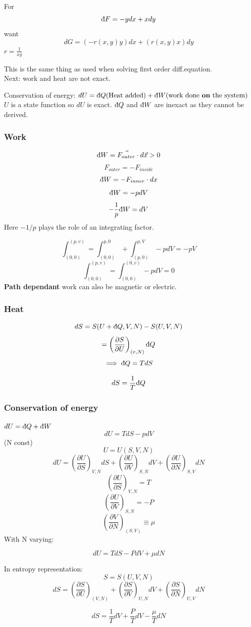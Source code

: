 \documentclass[11pt]{article}
\theoremstyle{definition}
\begin{document}
For \[ \text{\dj} F = -ydx+xdy \]
want 
\[ dG = (-r(x,y)y)dx + (r(x,y)x) dy\] 
$ r = \frac{1}{xy} $ 

This is the same thing as used when solving first order diff.equation. \\

Next: work and heat are not exact. 

Conservation of energy:
$ dU = \text{\dj} Q \text{(Heat added)} + \text{\dj} W \text{(work done \textbf{on} the system)}$
$ U $  is a state function so $ dU $ is exact.
$ \text{\dj} Q $ and $ \text{\dj} W $ are inexact as they cannot be derived.   

\subsubsection{Work}%
\label{ssub:Work}

\begin{equation}
	\text{\dj} W = \vec{F_{outer}} \cdot d \vec{x} > 0
\end{equation}
\[ F_{outer} = - F_{inside} \] 
\[ \text{\dj} W = -F_{inner} \cdot dx \] 
\[ \text{\dj} W = -pdV \] 
\[ -\frac{1}{p} \text{\dj} W = dV \] 
Here $ -1/p $ plays the role of an integrating factor.

\[ \int_{(0,0)}^{(p,v)} = \int_{(0,0)}^{p,0} + \int_{(p,0)}^{p,V} -p dV = -pV\] 
\[ \int_{(0,0)}^{(p,v)} = \int_{(0,0)}^{(0,v)} -pdV = 0   \] 
\textbf{Path dependant} 
work can also be magnetic or electric.
\subsubsection{Heat}%
\[ dS = S(U+\text{\dj} Q, V, N) - S(U,V,N) \] 
\[ = \left( \frac{\partial S}{\partial U} \right)_{(v,N)} \text{\dj} Q  \] 
\[ \implies \text{\dj} Q = T dS \] 

\[ dS = \frac{1}{T} \text{\dj} Q \] 

\subsubsection{Conservation of energy}%
\label{ssub:Conservationofenergy}
$ dU = \text{\dj} Q + \text{\dj} W $ 
\[ dU = T dS - pdV \] (N const)
\[ U = U(S,V,N) \] 
\[ dU = \left ( \frac{\partial U}{\partial S}\right )_{V,N} dS + \left ( \frac{\partial U}{\partial V}\right )_{S,N} dV + \left( \frac{\partial U}{\partial N}\right )_{S,V} dN \] 
\[ \left(\frac{\partial U}{\partial S}\right)_{V,N} = T \] 
\[ \left(\frac{\partial U}{\partial V}\right)_{S,N} = -P \] 
\[ \left(\frac{\partial V}{\partial N}\right)_{(S,V)} \equiv \mu \] 
With N varying:
\begin{shaded*}
\[ dU = TdS - PdV + \mu dN \] 
\end{shaded*}
In entropy representation:
	\[ S = S(U,V,N) \] 
	\[ dS = \left(\frac{\partial S}{\partial U}\right)_{(V,N)} + \left(\frac{\partial S}{\partial V}\right)_{U,N} dV +
	\left(\frac{\partial S}{\partial N}\right)_{U,V} dN\] 	
\begin{shaded*}
	\[ dS = \frac{1}{T} dV + \frac{P}{T}dV - \frac{\mu}{T}dN \] 
\end{shaded*}
\end{document}
